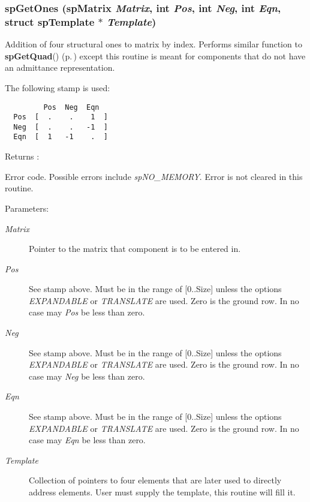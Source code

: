 \subsubsection{ sp\-Get\-Ones ({\bf sp\-Matrix} {\em Matrix}, int {\em Pos}, int {\em Neg}, int {\em Eqn}, struct {\bf sp\-Template} $\ast$ {\em Template})}\label{spBuild_8c_a15}


Addition of four structural ones to matrix by index. Performs similar function to {\bf sp\-Get\-Quad}() {\rm (p.\,\pageref{spBuild_8c_a14})} except this routine is meant for components that do not have an admittance representation.

The following stamp is used: 

\footnotesize\begin{verbatim}         Pos  Neg  Eqn
  Pos  [  .    .    1  ]
  Neg  [  .    .   -1  ]
  Eqn  [  1   -1    .  ]
\end{verbatim}\normalsize 


\begin{Desc}
\item[Returns :]\par
 Error code. Possible errors include {\em sp\-NO\_\-MEMORY}. Error is not cleared in this routine.\end{Desc}
\begin{Desc}
\item[Parameters: ]\par
\begin{description}
\item[{\em 
Matrix}]Pointer to the matrix that component is to be entered in. \item[{\em 
Pos}]See stamp above. Must be in the range of [0..Size] unless the options {\em EXPANDABLE} or {\em TRANSLATE} are used. Zero is the ground row. In no case may {\em Pos} be less than zero. \item[{\em 
Neg}]See stamp above. Must be in the range of [0..Size] unless the options {\em EXPANDABLE} or {\em TRANSLATE} are used. Zero is the ground row. In no case may {\em Neg} be less than zero. \item[{\em 
Eqn}]See stamp above. Must be in the range of [0..Size] unless the options {\em EXPANDABLE} or {\em TRANSLATE} are used. Zero is the ground row. In no case may {\em Eqn} be less than zero. \item[{\em 
Template}]Collection of pointers to four elements that are later used to directly address elements. User must supply the template, this routine will fill it. \end{description}
\end{Desc}

